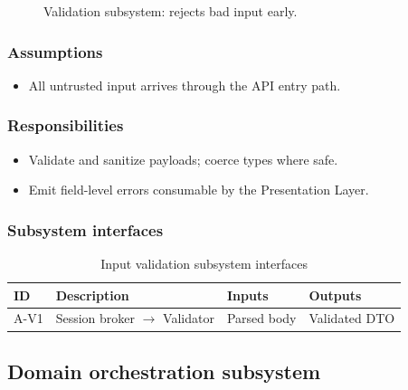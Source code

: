 \begin{figure}[H]
\centering
{}
\caption{Validation subsystem: rejects bad input early.}
\label{fig:app-val}
\end{figure}

\subsubsection{Assumptions}
\begin{itemize}
  \item All untrusted input arrives through the API entry path.
\end{itemize}

\subsubsection{Responsibilities}
\begin{itemize}
  \item Validate and sanitize payloads; coerce types where safe.
  \item Emit field-level errors consumable by the Presentation Layer.
\end{itemize}

\subsubsection{Subsystem interfaces}
\begin{table}[H]
\centering
\small
\begin{tabular}{|p{0.9cm}|p{3.4cm}|p{3.0cm}|p{3.5cm}|}
\hline
\textbf{ID} & \textbf{Description} & \textbf{Inputs} & \textbf{Outputs} \\
\hline
A-V1 & Session broker $\rightarrow$ Validator & Parsed body & Validated DTO \\
\hline
\end{tabular}
\caption{Input validation subsystem interfaces}
\end{table}

\subsection{Domain orchestration subsystem}

